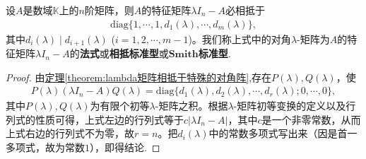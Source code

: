 \documentclass[../../main.tex]{subfiles}%
\begin{document}
\begin{corollary}\label{corollary:特征矩阵的法式}
设$A$是数域$\mathbb{K}$上的$n$阶矩阵，则$A$的特征矩阵$\lambda I_n - A$必相抵于
\begin{align*}
\mathrm{diag}\{1,\cdots,1,d_1(\lambda),\cdots,d_m(\lambda)\},
\end{align*}
其中$d_i(\lambda)\mid d_{i + 1}(\lambda)$ ($i = 1,2,\cdots,m - 1$)。我们称上式中的对角$\lambda$-矩阵为$A$的特征矩阵$\lambda I_n-A$的\textbf{法式}或\textbf{相抵标准型}或$\mathbf{Smith}$\textbf{标准型}. 
\end{corollary}
\begin{proof}
由\hyperref[theorem:lambda矩阵相抵于特殊的对角阵]{定理\ref{theorem:lambda矩阵相抵于特殊的对角阵}},存在$P(\lambda),Q(\lambda)$，使
\begin{align*}
P(\lambda)(\lambda I_n - A)Q(\lambda)=\mathrm{diag}\{d_1(\lambda),d_2(\lambda),\cdots,d_r(\lambda);0,\cdots,0\},
\end{align*}
其中$P(\lambda),Q(\lambda)$为有限个初等$\lambda$-矩阵之积。根据$\lambda$-矩阵初等变换的定义以及行列式的性质可得，上式左边的行列式等于$c|\lambda I_n - A|$，其中$c$是一个非零常数，从而上式右边的行列式不为零，故$r = n$。把$d_i(\lambda)$中的常数多项式写出来（因是首一多项式，故为常数$1$），即得结论.
\end{proof}
\end{document}
